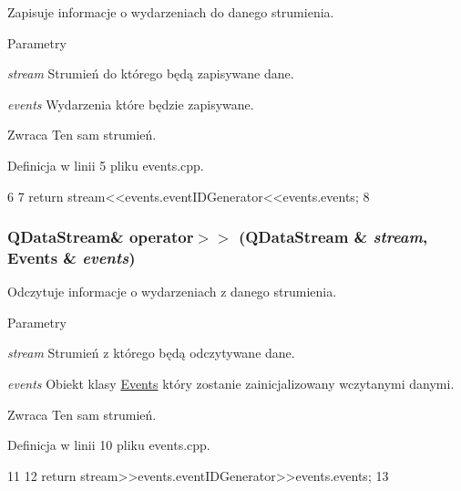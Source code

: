 Zapisuje informacje o wydarzeniach do danego strumienia. 


\begin{DoxyParams}{Parametry}
\item[{\em stream}]Strumień do którego będą zapisywane dane. \item[{\em events}]Wydarzenia które będzie zapisywane. \end{DoxyParams}
\begin{DoxyReturn}{Zwraca}
Ten sam strumień. 
\end{DoxyReturn}


Definicja w linii 5 pliku events.cpp.




\begin{DoxyCode}
6 {
7     return stream<<events.eventIDGenerator<<events.events;
8 }
\end{DoxyCode}


\hypertarget{classEvents_a9e3a2b909c5dcbc9519365ccafc4a96f}{
\subsubsection[{operator$>$$>$}]{\setlength{\rightskip}{0pt plus 5cm}QDataStream\& operator$>$$>$ (QDataStream \& {\em stream}, \/  {\bf Events} \& {\em events})}}
\label{classEvents_a9e3a2b909c5dcbc9519365ccafc4a96f}


Odczytuje informacje o wydarzeniach z danego strumienia. 


\begin{DoxyParams}{Parametry}
\item[{\em stream}]Strumień z którego będą odczytywane dane. \item[{\em events}]Obiekt klasy \hyperlink{classEvents}{Events} który zostanie zainicjalizowany wczytanymi danymi. \end{DoxyParams}
\begin{DoxyReturn}{Zwraca}
Ten sam strumień. 
\end{DoxyReturn}


Definicja w linii 10 pliku events.cpp.




\begin{DoxyCode}
11 {
12     return stream>>events.eventIDGenerator>>events.events;
13 }
\end{DoxyCode}




